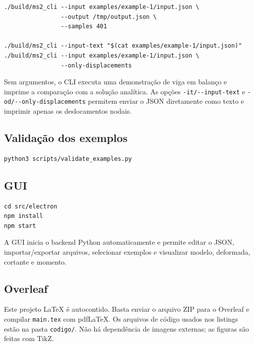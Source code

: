 \documentclass[12pt,a4paper]{article}
\begin{document}
\begin{verbatim}
./build/ms2_cli --input examples/example-1/input.json \
                --output /tmp/output.json \
                --samples 401

./build/ms2_cli --input-text "$(cat examples/example-1/input.json)"
./build/ms2_cli --input examples/example-1/input.json \
                --only-displacements
\end{verbatim}

Sem argumentos, o CLI executa uma demonstração de viga em balanço e imprime a comparação com a solução analítica. As opções \verb|-it/--input-text| e \verb|-od/--only-displacements| permitem enviar o JSON diretamente como texto e imprimir apenas os deslocamentos nodais.

\subsection{Validação dos exemplos}

\begin{verbatim}
python3 scripts/validate_examples.py
\end{verbatim}

\subsection{GUI}

\begin{verbatim}
cd src/electron
npm install
npm start
\end{verbatim}

A GUI inicia o backend Python automaticamente e permite editar o JSON, importar/exportar arquivos, selecionar exemplos e visualizar modelo, deformada, cortante e momento.

\subsection{Overleaf}

Este projeto LaTeX é autocontido. Basta enviar o arquivo ZIP para o Overleaf e compilar \texttt{main.tex} com pdfLaTeX. Os arquivos de código usados nos listings estão na pasta \texttt{codigo/}. Não há dependência de imagens externas; as figuras são feitas com TikZ.
\end{document}
